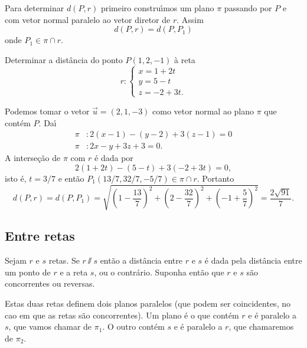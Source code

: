 Para determinar $d(P,r)$ primeiro constru{\'\i}mos um plano $\pi$ passando por $P$ e com vetor normal paralelo ao vetor diretor de $r$. Assim
\[
    d(P,r) = d(P,P_1)
\]
onde $P_1 \in \pi\cap r$.

\begin{exemplo}
    Determinar a dist\^ancia do ponto $P(1,2,-1)$ \`a reta
    \[
        r: \begin{cases}
            x = 1 + 2t\\
            y = 5 - t\\
            z = -2 + 3t.
        \end{cases}
    \]
    \begin{solucao}
        Podemos tomar o vetor $\vec{u} = (2,1,-3)$ como vetor normal ao plano $\pi$ que cont\'em $P$. Da{\'\i}
        \begin{align*}
            \pi &: 2(x - 1) - (y - 2) + 3(z - 1) = 0\\
            \pi &: 2x - y + 3z + 3 = 0.
        \end{align*}
        A interse\c{c}\~ao de $\pi$ com $r$ \'e dada por
        \[
            2(1 + 2t) - (5 - t) + 3(-2 + 3t) = 0,
        \]
        isto \'e, $t = 3/7$ e ent\~ao $P_1(13/7,32/7,-5/7) \in \pi\cap r$. Portanto
        \[
            d(P,r) = d(P,P_1) = \sqrt{\left(1 - \dfrac{13}{7}\right)^2 + \left(2 - \dfrac{32}{7}\right)^2 + \left(-1 + \dfrac{5}{7}\right)^2} = \dfrac{2\sqrt{91}}{7}.
        \]
    \end{solucao}
\end{exemplo}


\subsection{Entre retas} %
\label{sub:entre_retas}

Sejam $r$ e $s$ retas. Se $r \varparallel s$ ent\~ao a dist\^ancia entre $r$ e $s$ \'e dada pela dist\^ancia entre um ponto de $r$ e a reta $s$, ou o contr\'ario. Suponha ent\~ao que $r$ e $s$ s\~ao concorrentes ou reversas. %

Estas duas retas definem dois planos paralelos (que podem ser coincidentes, no cao em que as retas s\~ao concorrentes). Um plano \'e o que cont\'em $r$ e \'e paralelo a $s$, que vamos chamar de $\pi_1$. O outro cont\'em $s$ e \'e paralelo a $r$, que chamaremos de $\pi_2$.

